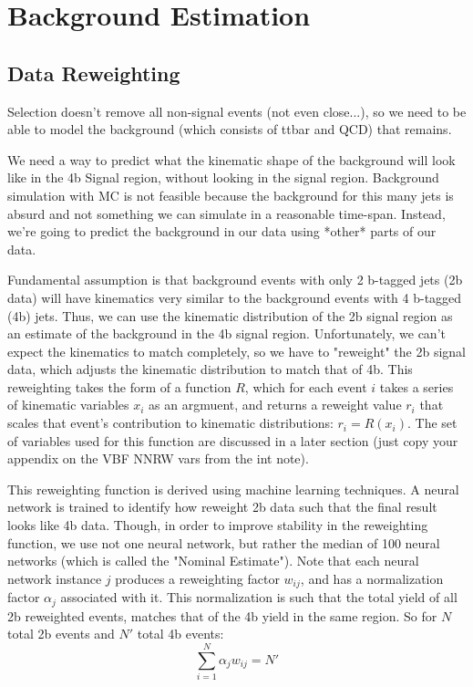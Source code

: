 \chapter{Background Estimation}

\section{Data Reweighting}

Selection doesn't remove all non-signal events (not even close...),
    so we need to be able to model the background (which consists of ttbar and QCD) that remains.

We need a way to predict what the kinematic shape of the background will look like in the 4b Signal region,
    without looking in the signal region.
Background simulation with MC is not feasible because the background for this many jets is absurd
    and not something we can simulate in a reasonable time-span.
Instead, we're going to predict the background in our data using *other* parts of our data.

Fundamental assumption is that background events with only 2 b-tagged jets (2b data)
    will have kinematics very similar to the background events with 4 b-tagged (4b) jets.
Thus, we can use the kinematic distribution of the 2b signal region as an estimate of the background in the 4b signal region.
Unfortunately, we can't expect the kinematics to match completely, so we have to "reweight" the 2b signal data,
    which adjusts the kinematic distribution to match that of 4b.
This reweighting takes the form of a function $R$,
    which for each event $i$ takes a series of kinematic variables $x_i$ as an argmuent,
    and returns a reweight value $r_i$ that scales that event's contribution to kinematic distributions:
    $r_i = R(x_i)$.
The set of variables used for this function are discussed in a later section
    (just copy your appendix on the VBF NNRW vars from the int note).

This reweighting function is derived using machine learning techniques.
A neural network is trained to identify how reweight 2b data such that the final result looks like 4b data.
Though, in order to improve stability in the reweighting function,
    we use not one neural network, but rather the median of 100 neural networks (which is called the "Nominal Estimate").
Note that each neural network instance $j$ produces a reweighting factor $w_{ij}$, and has a normalization factor $\alpha_j$ associated with it.
This normalization is such that the total yield of all 2b reweighted events,
    matches that of the 4b yield in the same region.
So for $N$ total 2b events and $N'$ total 4b events:
    \begin{equation}
    \sum_{i=1}^{N} \alpha_j w_{ij} = N'
    \end{equation}

